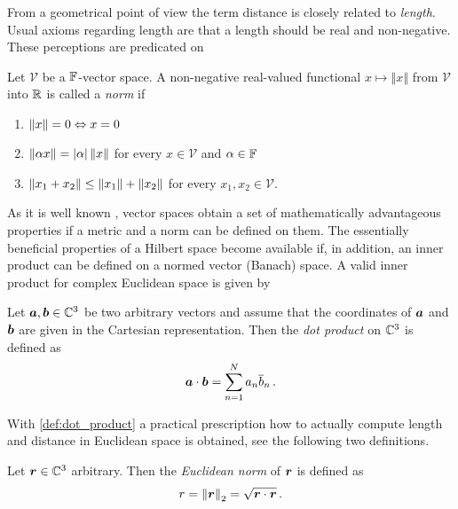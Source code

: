 From a geometrical point of view the term distance is closely related to
\emph{length}.
Usual axioms regarding length are that a length should be real and non-negative.
These perceptions are predicated on
\begin{definition}[Norm]\label{def:norm}
	Let $\mathcal{V}$ be a $\mathbb{F}$-vector space.
	A non-negative real-valued functional $x \mapsto \left\Vert x \right\Vert$
	from $\mathcal{V}$ into $\mathbb{R}$ is called a \emph{norm} if
	\begin{enumerate}[label=(\alph*)]
		\item $\left\Vert x \right\Vert = 0 \Leftrightarrow x = 0$ 
		\item $\left\Vert \alpha x \right\Vert = \left\vert\alpha\right\vert \left\Vert x \right\Vert$ for every
		$x \in \mathcal{V}$ and $\alpha \in \mathbb{F}$
		\item $\left\Vert x_1 + x_2 \right\Vert \le \left\Vert x_1 \right\Vert + \left\Vert x_2 \right\Vert$ for every
		$x_1, x_2 \in \mathcal{V}$.
	\end{enumerate}
\end{definition}

As it is well known \cite{heuser2006}, vector spaces obtain a set of
mathematically advantageous properties if a metric and a norm can be defined on
them.
The essentially beneficial properties of a Hilbert space become available if,
in addition, an inner product can be defined on a normed vector (Banach) space.
A valid inner product for complex Euclidean space is given by
\begin{definition}\label{def:dot_product}
	Let $\pvec{a}, \pvec{b} \in \C^3$ be two arbitrary vectors and
	assume that the coordinates of $\pvec{a}$ and $\pvec{b}$ are given in
	the Cartesian representation.
	Then the \emph{dot product} on $\mathbb{C}^3$ is defined as 
	\begin{equation}
		\pvec{a} \cdot \pvec{b} =
		\sum\limits_{n = 1}^{N} a_n \complexConjugate{b}_n
		\, .
	\end{equation}
\end{definition}

With \cref{def:dot_product} a practical prescription how to actually compute
length and distance in Euclidean space is obtained, see the following two
definitions.

\begin{definition}\label{def:euclidean_norm}
	Let $\pvec{r} \in \C^3$ arbitrary. Then the \emph{Euclidean norm} of
	$\pvec{r}$ is defined as
	\begin{equation}
		r = \euclideanNorm{\pvec{r}} = \sqrt{\pvec{r} \cdot \pvec{r}} \, .
	\end{equation}
\end{definition}

